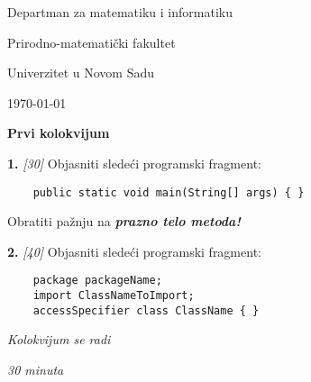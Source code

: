 \documentclass[11pt, a4paper]{article}
\begin{document}
\begin{flushleft}
    {\small 
    Departman za matematiku i informatiku

    Prirodno-matemati\v{c}ki fakultet

    Univerzitet u Novom Sadu}
\end{flushleft}

\begin{flushright}
    \today    
\end{flushright}

\bigskip

\begin{center}
    \large
    \textbf{Prvi kolokvijum}
\end{center}

\bigskip

\noindent
\textbf{1.} \textsl{[30]} Objasniti slede\' ci programski fragment:
\begin{verbatim}
    public static void main(String[] args) { }
\end{verbatim}
Obratiti pa\v{z}nju na \textbf{\textit{prazno telo metoda!}}

\bigskip

\noindent
\textbf{2.} \textsl{[40]} Objasniti slede\' ci programski fragment:
\begin{verbatim}
    package packageName;
    import ClassNameToImport;
    accessSpecifier class ClassName { }
\end{verbatim}

\vfill

\begin{center}
    \textit{Kolokvijum se radi}

    \textit{30 minuta}
\end{center}
\end{document}
